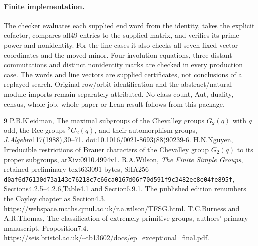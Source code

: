 \documentclass[11pt]{article}
\begin{document}
\paragraph{Finite implementation.}
The checker evaluates each supplied end word from the identity, takes
the explicit cofactor, compares all49 entries to the supplied matrix,
and verifies its prime power and nonidentity. For the line cases it
also checks all seven fixed-vector coordinates and the moved minor.
Four involution equations, three distant commutations and distinct
nonidentity marks are checked in every production case. The words and
line vectors are supplied certificates, not conclusions of a replayed
search. Original row/orbit identification and the abstract/natural-module
imports remain separately attributed. No class count, Aut, duality,
census, whole-job, whole-paper or Lean result follows from this package.

\begin{thebibliography}{9}
 P.B.Kleidman, The maximal subgroups of the Chevalley groups
$G_2(q)$ with $q$ odd, the Ree groups ${}^2G_2(q)$, and their automorphism
groups, \emph{J.Algebra}117(1988),30--71.
\href{https://doi.org/10.1016/0021-8693(88)90239-6}{doi:10.1016/0021-8693(88)90239-6}.
 H.N.Nguyen, Irreducible restrictions of Brauer characters
of the Chevalley group $G_2(q)$ to its proper subgroups,
\href{https://arxiv.org/abs/0910.4994}{arXiv:0910.4994v1}.
 R.A.Wilson, \emph{The Finite Simple Groups}, retained
preliminary text633091 bytes, SHA256
\texttt{d0af6d76130d73a143e76218c7c66ca0167d06f70d591f9c3482ec8e04fe895f},
Sections4.2.5--4.2.6,Table4.1 and Section5.9.1.
The published edition renumbers the Cayley chapter as Section4.3.
\url{https://webspace.maths.qmul.ac.uk/r.a.wilson/TFSG.html}.
 T.C.Burness and A.R.Thomas, The classification of extremely
primitive groups, authors' primary manuscript, Proposition7.4.
\url{https://seis.bristol.ac.uk/~tb13602/docs/ep_exceptional_final.pdf}.
\end{thebibliography}
\end{document}
